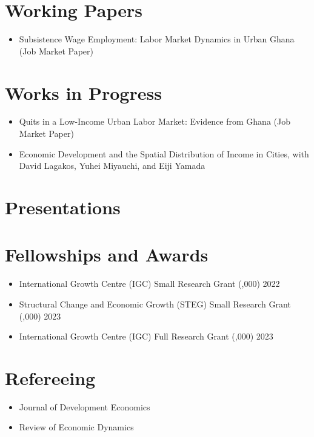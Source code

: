 \documentclass[12pt]{article}
\newenvironment{customitemize}
{ \begin{itemize}[
	leftmargin=\parindent,
	itemindent=-0.5\parindent,
	topsep = 0pt, 
	itemsep = -1pt, 
	label={}] }
{\end{itemize} }
\begin{document}
\section*{Working Papers}
\begin{customitemize}
	\item Subsistence Wage Employment: Labor Market Dynamics in Urban Ghana (Job Market Paper)
\end{customitemize}
\section*{Works in Progress}

\begin{customitemize}
	\item Quits in a Low-Income Urban Labor Market: Evidence from Ghana (Job Market Paper)
	\item Economic Development and the Spatial Distribution of Income in Cities, with David Lagakos, Yuhei Miyauchi, and Eiji Yamada
\end{customitemize}

\section*{Presentations}
\vspace{5pt}


\section*{Fellowships and Awards}


\begin{customitemize}
	\item International Growth Centre (IGC) Small Research Grant (,000) \hfill 2022
	\item Structural Change and Economic Growth (STEG) Small Research Grant (,000) \hfill 2023
	\item International Growth Centre (IGC) Full Research Grant (,000) \hfill 2023
\end{customitemize}

\section*{Refereeing}


\begin{customitemize}
	\item Journal of Development Economics
	\item Review of Economic Dynamics
\end{customitemize}
\end{document}
